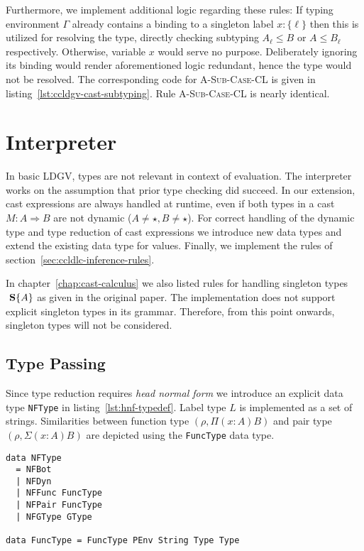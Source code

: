 Furthermore, we implement additional logic regarding these rules: If typing environment $\Gamma$ already contains a binding to a singleton label $x : \{\ell\}$ then this is utilized for resolving the \case type, directly checking subtyping $A_\ell \leq B$ or $A \leq B_\ell$ respectively. Otherwise, variable $x$ would serve no purpose. Deliberately ignoring its binding would render aforementioned logic redundant, hence the \case type would not be resolved. The corresponding code for \textsc{A-Sub-Case-CL} is given in listing~\ref{lst:ccldgv-cast-subtyping}. Rule \textsc{A-Sub-Case-CL} is nearly identical.

\section{Interpreter}

In basic LDGV, types are not relevant in context of evaluation. The interpreter works on the assumption that prior type checking did succeed. In our extension, cast expressions are always handled at runtime, even if both types in a cast $M : A \Rightarrow B$ are not dynamic ($A \neq \star, B \neq \star$).
For correct handling of the dynamic type and type reduction of cast expressions we introduce new data types and extend the existing data type for values. Finally, we implement the rules of section~\ref{sec:ccldlc-inference-rules}.

In chapter~\ref{chap:cast-calculus} we also listed rules for handling singleton types $\text{ \textbf{S}}\{A\}$ as given in the original paper. The implementation does not support explicit singleton types in its grammar. Therefore, from this point onwards, singleton types will not be considered.

\subsection{Type Passing}

Since type reduction requires \emph{head normal form} we introduce an explicit data type \texttt{NFType} in listing~\ref{lst:hnf-typedef}. Label type $L$ is implemented as a set of strings. Similarities between function type $(\rho, \Pi(x:A)B)$ and pair type $(\rho, \Sigma(x:A)B)$ are  depicted using the \texttt{FuncType} data type.

\begin{lstlisting}[float,
  label=lst:hnf-typedef,
  caption=Haskell: HNF type definition (\texttt{ProcessEnvironment.hs})]
data NFType
  = NFBot
  | NFDyn
  | NFFunc FuncType
  | NFPair FuncType
  | NFGType GType

data FuncType = FuncType PEnv String Type Type
\end{lstlisting}


